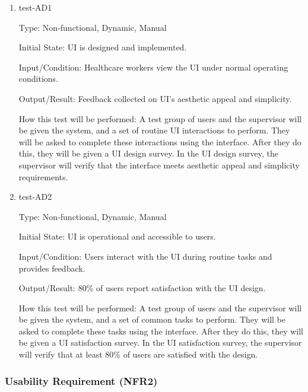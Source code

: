 \documentclass[12pt, titlepage]{article}
\begin{document}
\begin{enumerate}
    \item{test-AD1} \label{test-AD1}
    
    Type: Non-functional, Dynamic, Manual
    
    Initial State: UI is designed and implemented.
    
    Input/Condition: Healthcare workers view the UI under normal operating conditions.
    
    Output/Result: Feedback collected on UI's aesthetic appeal and simplicity.
    
    How this test will be performed: A test group of users and the supervisor will be given the system, and a set of routine UI interactions to perform. They will be asked to complete these interactions using the interface. After they do this, they will be given a UI design survey. In the UI design survey, the supervisor will verify that the interface meets aesthetic appeal and simplicity requirements.


    \item{test-AD2} \label{test-AD2}
    
    Type: Non-functional, Dynamic, Manual
    
    Initial State: UI is operational and accessible to users.
    
    Input/Condition: Users interact with the UI during routine tasks and provides feedback.
    
    Output/Result: 80\% of users report satisfaction with the UI design.
    
    How this test will be performed: A test group of users and the supervisor will be given the system, and a set of common tasks to perform. They will be asked to complete these tasks using the interface. After they do this, they will be given a UI satisfaction survey. In the UI satisfaction survey, the supervisor will verify that at least 80\% of users are satisfied with the design.
\end{enumerate}

\subsubsection{Usability Requirement (NFR2)} \label{section:4.2.2}
\end{document}
